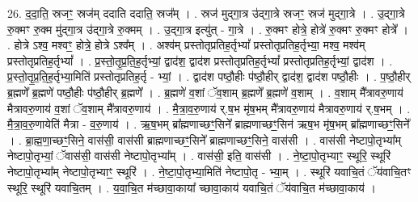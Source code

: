\documentclass[17pt]{extarticle}
\begin{document}
26. द॒दा॒ति॒ स्रजꣳ॒॒ स्रज॑म् ददाति ददाति॒ स्रज᳚म् । . स्रज॑ मुद्‍गा॒त्र उ॑द्‍गा॒त्रे स्रजꣳ॒॒ स्रज॑ मुद्‍गा॒त्रे । . उ॒द्‍गा॒त्रे रु॒क्मꣳ रु॒क्म मु॑द्‍गा॒त्र उ॑द्‍गा॒त्रे रु॒क्मम् । . उ॒द्‍गा॒त्र इत्यु॑त् - गा॒त्रे । . रु॒क्मꣳ होत्रे॒ होत्रे॑ रु॒क्मꣳ रु॒क्मꣳ होत्रे᳚ । . होत्रे ऽश्व॒ मश्वꣳ॒॒ होत्रे॒ होत्रे ऽश्व᳚म् । . अश्व॑म् प्रस्तोतृप्रतिह॒र्तृभ्यां᳚ प्रस्तोतृप्रतिह॒र्तृभ्या॒ मश्व॒ मश्व॑म् प्रस्तोतृप्रतिह॒र्तृभ्यां᳚ । . प्र॒स्तो॒तृ॒प्र॒ति॒ह॒र्तृभ्यां॒ द्वाद॑श॒ द्वाद॑श प्रस्तोतृप्रतिह॒र्तृभ्यां᳚ प्रस्तोतृप्रतिह॒र्तृभ्यां॒ द्वाद॑श । . प्र॒स्तो॒तृ॒प्र॒ति॒ह॒र्तृभ्या॒मिति॑ प्रस्तोतृप्रतिह॒र्तृ - भ्यां॒ । . द्वाद॑श पष्ठौ॒हीः प॑ष्ठौ॒हीर् द्वाद॑श॒ द्वाद॑श पष्ठौ॒हीः । . प॒ष्ठौ॒हीर् ब्र॒ह्मणे᳚ ब्र॒ह्मणे॑ पष्ठौ॒हीः प॑ष्ठौ॒हीर् ब्र॒ह्मणे᳚ । . ब्र॒ह्मणे॑ व॒शां ॅव॒शाम् ब्र॒ह्मणे᳚ ब्र॒ह्मणे॑ व॒शाम् । . व॒शाम् मै᳚त्रावरु॒णाय॑ मैत्रावरु॒णाय॑ व॒शां ॅव॒शाम् मै᳚त्रावरु॒णाय॑ । . मै॒त्रा॒व॒रु॒णाय॑ र्.ष॒भ मृ॑ष॒भम् मै᳚त्रावरु॒णाय॑ मैत्रावरु॒णाय॑ र्.ष॒भम् । . मै॒त्रा॒व॒रु॒णायेति॑ मैत्रा - व॒रु॒णाय॑ । . ऋ॒ष॒भम् ब्रा᳚ह्मणाच्छꣳ॒॒सिने᳚ ब्राह्मणाच्छꣳ॒॒सिन॑ ऋष॒भ मृ॑ष॒भम् ब्रा᳚ह्मणाच्छꣳ॒॒सिने᳚ । . ब्रा॒ह्म॒णा॒च्छꣳ॒॒सिने॒ वास॑सी॒ वास॑सी ब्राह्मणाच्छꣳ॒॒सिने᳚ ब्राह्मणाच्छꣳ॒॒सिने॒ वास॑सी । . वास॑सी नेष्टापो॒तृभ्या᳚म् नेष्टापो॒तृभ्यां॒ ॅवास॑सी॒ वास॑सी नेष्टापो॒तृभ्या᳚म् । . वास॑सी॒ इति॒ वास॑सी । . ने॒ष्टा॒पो॒तृभ्याꣳ॒॒ स्थूरि॒ स्थूरि॑ नेष्टापो॒तृभ्या᳚म् नेष्टापो॒तृभ्याꣳ॒॒ स्थूरि॑ । . ने॒ष्टा॒पो॒तृभ्या॒मिति॑ नेष्टापो॒तृ - भ्या॒म् । . स्थूरि॑ यवाचि॒तं ॅय॑वाचि॒तꣳ स्थूरि॒ स्थूरि॑ यवाचि॒तम् । . य॒वा॒चि॒त म॑च्छावा॒काया᳚ च्छावा॒काय॑ यवाचि॒तं ॅय॑वाचि॒त म॑च्छावा॒काय॑ । \newline
\end{document}
